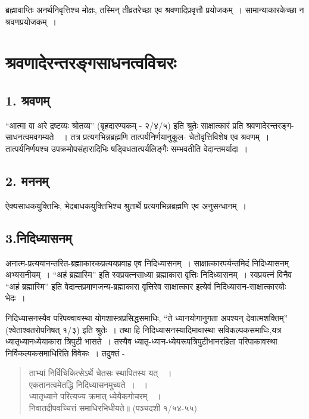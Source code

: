 {ब्रह्मावाप्तिः अनर्थनिवृत्तिश्च 	मोक्षः, तस्मिन् तीव्रतरेच्छा 	एव श्रवणादिप्रवृत्तौ प्रयोजकम्~।  सामान्याकारकेच्छा न श्रवणप्रयोजकम्~। 

\section*{श्रवणादेरन्तरङ्गसाधनत्वविचरः}

\subsection*{1. श्रवणम्} 

“आत्मा वा अरे द्रष्टव्यः श्रोतव्य” (बृहदारण्यकम् - २/४/५) इति श्रुतेः साक्षात्कारं प्रति श्रवणादेरन्तरङ्ग-साधनत्वमवगम्यते~~। तत्र प्रत्यगभिन्नब्रह्मणि तात्पर्यनिर्णयानुकूल- चेतोवृत्तिविशेष एव श्रवणम्~। तात्पर्यनिर्णयश्च उपक्रमोपसंहारादिभिः षड्विधतात्पर्यलिङ्गैः सम्भवतीति वेदान्तमर्यादा~। 

\subsection*{2. मननम् }

ऐक्यसाधकयुक्तिभिः, भेदबाधकयुक्तिभिश्च श्रुतार्थे प्रत्यगभिन्नब्रह्मणि एव अनुसन्धानम्~। 

\subsection*{3.निदिध्यासनम् }

अनात्म-प्रत्ययानन्तरित-ब्रह्माकारकप्रत्ययप्रवाह एव निदिध्यासनम्~। साक्षात्कारपर्यन्तमिदं निदिध्यासनम् अभ्यसनीयम्~। “अहं ब्रह्मास्मि” इति स्वप्रयत्नसाध्या ब्रह्माकारा वृत्तिः निदिध्यासनम्~। स्वप्रयत्नं विनैव “अहं ब्रह्मास्मि” इति वेदान्तप्रमाणजन्य-ब्रह्माकारा वृत्तिरेव साक्षात्कार इत्येवं निदिध्यासन-साक्षात्कारयोः भेदः~। 

निदिध्यासनस्यैव परिपक्वावस्था योगशास्त्रप्रसिद्धसमाधिः, “ते ध्यानयोगानुगता अपश्यन् देवात्मशक्तिम्” (श्वेताश्वतरोपनिषत् १/३) इति श्रुतेः~। तथा हि निदिध्यासनस्यादिमावास्था सविकल्पकसमाधिः,यत्र ध्यातृध्यानध्येयाकारा त्रिपुटी भासते~। तस्यैव ध्यातृ-ध्यान-ध्येयरूपत्रिपुटीभानरहिता परिपाकावस्था निर्विकल्पकसमाधिरिति विवेकः~। तदुक्तं - 

\begin{verse}
ताभ्यां निर्विचिकित्सेऽर्थे चेतसः स्थापितस्य यत्~~। \\
एकतानत्वमेतद्धि निदिध्यासनमुच्यते~। ~। \\
ध्यातृध्याने परित्यज्य क्रमात् ध्येयैकगोचरम्~~। \\ 
निवातदीपवच्चित्तं समाधिरभिधीयते॥ (पञ्चदशी १/५४-५५)
\end{verse}

}
